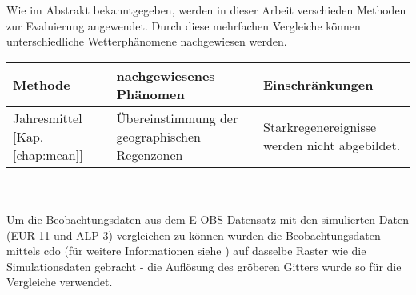 Wie im Abstrakt bekanntgegeben, werden in dieser Arbeit verschieden Methoden zur Evaluierung angewendet. Durch diese mehrfachen Vergleiche können unterschiedliche Wetterphänomene nachgewiesen werden.\\

\begin{tabularx}{\textwidth}{|X|X|X|}
		\hline
		\textbf{Methode} & \textbf{nachgewiesenes Phänomen}& \textbf{Einschränkungen}\\
		\hline
		Jahresmittel [Kap. \ref{chap:mean}] & Übereinstimmung der geographischen Regenzonen & Starkregenereignisse werden nicht abgebildet.\\
		\hline
\end{tabularx}
\\ \hfill \\

Um die Beobachtungsdaten aus dem E-OBS Datensatz mit den simulierten Daten (EUR-11 und ALP-3) vergleichen zu können wurden die Beobachtungsdaten mittels cdo (für weitere Informationen siehe \cite{cdo}) auf dasselbe Raster wie die Simulationsdaten gebracht - die Auflösung des gröberen Gitters wurde so für die Vergleiche verwendet. 
